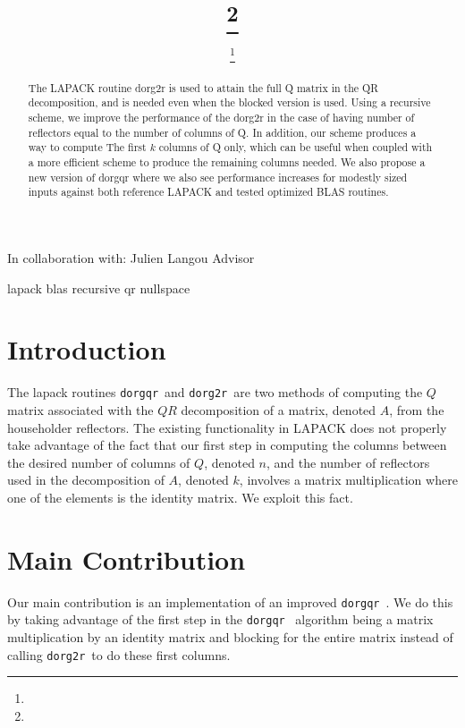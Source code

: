 \documentclass[review]{siamart220329}
\author{\TheName\thanks{\TheAddress}}
\title{{\TheTitle}\thanks{\TheFunding}}
\newcommand{\TheCollaborators}{%
  Julien Langou Advisor
}
\newcommand{\dorgqr}{\texttt{dorgqr}\ }
\newcommand{\dorg}{\texttt{dorg2r}\ }
\begin{document}
\maketitle

\begin{center}
In collaboration with:
  {\TheCollaborators}
\end{center}
\vspace{1cm}

\begin{abstract}
    The LAPACK routine dorg2r is used to attain the full Q matrix in the QR decomposition, and is needed even when the blocked 
    version is used. Using a recursive scheme, we improve the performance of the dorg2r in the case of having number of 
    reflectors equal to the number of columns of Q. In addition, our scheme produces a way to compute The first $k$ columns of 
    Q only, which can be useful when coupled with a more efficient scheme to produce the remaining columns needed. We also 
    propose a new version of dorgqr where we also see performance increases for modestly sized inputs against both reference 
    LAPACK and tested optimized BLAS routines.
\end{abstract}

\begin{keywords}
    lapack
    blas
    recursive
    qr
    nullspace
\end{keywords}

\section{Introduction}\label{sec:intro}
The lapack routines \dorgqr and \dorg are two methods of computing the $Q$ matrix associated with the $QR$ 
decomposition of a matrix, denoted $A$, from the householder reflectors. The existing functionality in LAPACK does not 
properly take advantage of the fact that our first step in computing the columns between the desired number of columns of $Q$, 
denoted $n$, and the number of reflectors used in the decomposition of $A$, denoted $k$, involves a matrix multiplication
where one of the elements is the identity matrix. We exploit this fact.

\section{Main Contribution}\label{sec:main}
Our main contribution is an implementation of an improved \dorgqr. We do this by taking advantage of the first step in the \dorgqr
algorithm being a matrix multiplication by an identity matrix and blocking for the entire matrix instead of calling \dorg to 
do these first columns.
\end{document}
